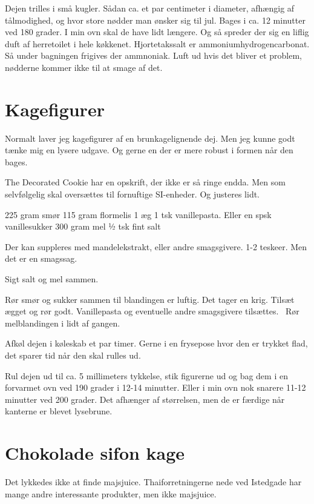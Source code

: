 \documentclass[
  letterpaper,
  DIV=11,
  numbers=noendperiod]{scrreprt}
\begin{document}
Dejen trilles i små kugler. Sådan ca. et par centimeter i diameter,
afhængig af tålmodighed, og hvor store nødder man ønsker sig til jul.
Bages i ca. 12 minutter ved 180 grader. I min ovn skal de have lidt
længere. Og så spreder der sig en liflig duft af herretoilet i hele
køkkenet. Hjortetakssalt er ammoniumhydrogencarbonat. Så under bagningen
frigives der ammnoniak. Luft ud hvis det bliver et problem, nødderne
kommer ikke til at smage af det.

\hypertarget{kagefigurer-1}{%
\section{Kagefigurer}\label{kagefigurer-1}}

Normalt laver jeg kagefigurer af en brunkagelignende dej. Men jeg kunne
godt tænke mig en lysere udgave. Og gerne en der er mere robust i formen
når den bages.

The Decorated Cookie har en opskrift, der ikke er så ringe endda. Men
som selvfølgelig skal oversættes til fornuftige SI-enheder. Og justeres
lidt.

225 gram smør 115 gram flormelis 1 æg 1 tsk vanillepasta. Eller en spsk
vanillesukker 300 gram mel ½ tsk fint salt

Der kan suppleres med mandelekstrakt, eller andre smagsgivere. 1-2
teskeer. Men det er en smagssag.

Sigt salt og mel sammen.

Rør smør og sukker sammen til blandingen er luftig. Det tager en krig.
Tilsæt ægget og rør godt. Vanillepasta og eventuelle andre smagsgivere
tilsættes.~ Rør melblandingen i lidt af gangen.

Afkøl dejen i køleskab et par timer. Gerne i en frysepose hvor den er
trykket flad, det sparer tid når den skal rulles ud.

Rul dejen ud til ca. 5 millimeters tykkelse, stik figurerne ud og bag
dem i en forvarmet ovn ved 190 grader i 12-14 minutter. Eller i min ovn
nok snarere 11-12 minutter ved 200 grader. Det afhænger af størrelsen,
men de er færdige når kanterne er blevet lysebrune.

\hypertarget{chokolade-sifon-kage-2}{%
\section{Chokolade sifon kage}\label{chokolade-sifon-kage-2}}

Det lykkedes ikke at finde majsjuice. Thaiforretningerne nede ved
Istedgade har mange andre interessante produkter, men ikke majsjuice.
\end{document}
